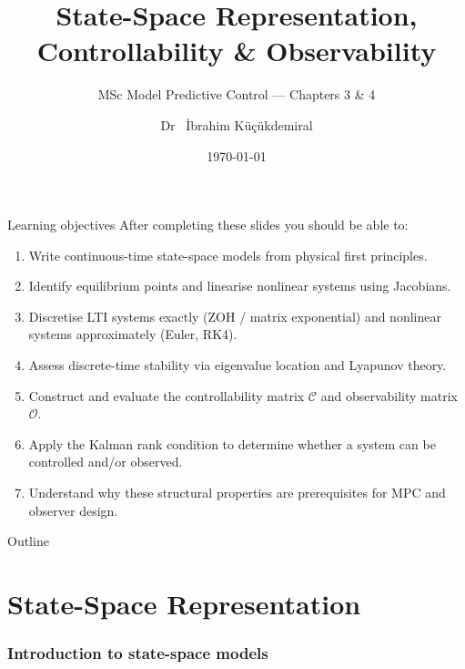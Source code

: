 \documentclass[aspectratio=169,10pt]{beamer}
\title[State-Space, Controllability \& Observability]%
      {State-Space Representation,\\Controllability \& Observability}
\subtitle{MSc Model Predictive Control --- Chapters 3 \& 4}
\author{Dr ~\.{I}brahim K\"{u}\c{c}\"{u}kdemiral}
\institute{Glasgow Caledonian University}
\date{\today}
\newcommand{\Ccal}{\mathcal{C}}
\newcommand{\Ocal}{\mathcal{O}}
\begin{document}
\begin{frame}
\titlepage
\end{frame}

\begin{frame}{Learning objectives}
After completing these slides you should be able to:
\begin{enumerate}
  \item Write continuous-time state-space models from physical first principles.
  \item Identify equilibrium points and linearise nonlinear systems using Jacobians.
  \item Discretise LTI systems exactly (ZOH / matrix exponential) and nonlinear systems approximately (Euler, RK4).
  \item Assess discrete-time stability via eigenvalue location and Lyapunov theory.
  \item Construct and evaluate the controllability matrix $\Ccal$ and observability matrix $\Ocal$.
  \item Apply the Kalman rank condition to determine whether a system can be controlled and/or observed.
  \item Understand why these structural properties are prerequisites for MPC and observer design.
\end{enumerate}
\end{frame}

\begin{frame}{Outline}
\tableofcontents
\end{frame}


\part{State-Space Representation}

\section{Introduction to state-space models}
\end{document}
